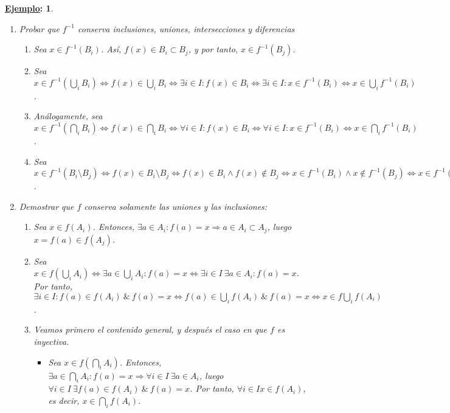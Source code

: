 \documentclass[10pt,a4paper,openright]{book}
\theoremstyle{break}
\newtheorem*{ej}{\underline{Ejemplo}:}
\begin{document}
\begin{ej}
\begin{enumerate}[label={(\arabic*)}]
 \item Probar que $f^{-1}$ conserva inclusiones, uniones, intersecciones y diferencias
 \begin{enumerate}[label={(\alph*)}]
 \item Sea $x \in f^{-1}(B_i)$. Así, $f(x) \in B_i \subset B_j$, y por tanto, $x \in f^{-1}(B_j)$.
 \item Sea $x \in f^{-1}(\bigcup_i B_i) \Leftrightarrow f(x) \in \bigcup_i B_i \Leftrightarrow \exists i \in I : f(x) \in B_i \Leftrightarrow \exists i \in I : x \in f^{-1} (B_i) \Leftrightarrow x \in \bigcup_i f^{-1}(B_i)$.
 \item  Análogamente, sea $x \in f^{-1}(\bigcap_i B_i) \Leftrightarrow f(x) \in \bigcap_i B_i \Leftrightarrow \forall i \in I : f(x) \in B_i \Leftrightarrow \forall i \in I : x \in f^{-1} (B_i) \Leftrightarrow x \in \bigcap_i f^{-1}(B_i)$.
 \item  Sea $x \in f^{-1} (B_i \setminus B_j) \Leftrightarrow f(x) \in B_i \setminus B_j \Leftrightarrow f(x) \in B_i \wedge f(x) \notin B_j \Leftrightarrow x \in  f^{-1}(B_i) \wedge x \notin  f^{-1}(B_j) \Leftrightarrow x \in  f^{-1}(B_i) \setminus  f^{-1}(B_j)$.
 \end{enumerate}
 \item Demostrar que $f$ conserva solamente las uniones y las inclusiones:
 \begin{enumerate}[label={(\alph*)}]
 \item  Sea $x \in f(A_i)$. Entonces, $\exists a \in A_i : f(a) = x \Rightarrow a \in A_i \subset A_j$, luego $x = f(a) \in f(A_j)$.
 \item Sea $x \in f(\bigcup_i A_i) \Leftrightarrow \exists a \in \bigcup_i A_i : f(a) = x \Leftrightarrow \exists i \in I \ \exists a \in A_i : f(a) = x$. Por tanto, $\exists i \in I : f(a) \in f(A_i) \ \& \ f(a) = x  \Leftrightarrow f(a) \in \bigcup_i f(A_i) \ \& \ f(a) = x \Leftrightarrow x \in f\bigcup_i f(A_i)$.
 \item Veamos primero el contenido general, y después el caso en que $f$ es inyectiva.
 \begin{itemize}
 \item Sea $x \in f(\bigcap_i A_i)$. Entonces, $\exists a \in \bigcap_i A_i : f(a) = x \Rightarrow \forall i \in I \ \exists a \in A_i$, luego $\forall i \in I \ \exists f(a) \in f(A_i) \ \& \ f(a) =x$. Por tanto, $\forall i \in I x \in f(A_i)$, es decir, $x \in \bigcap_i f(A_i)$.

\end{itemize}
\end{enumerate}
\end{enumerate}
\end{ej}
\end{document}
